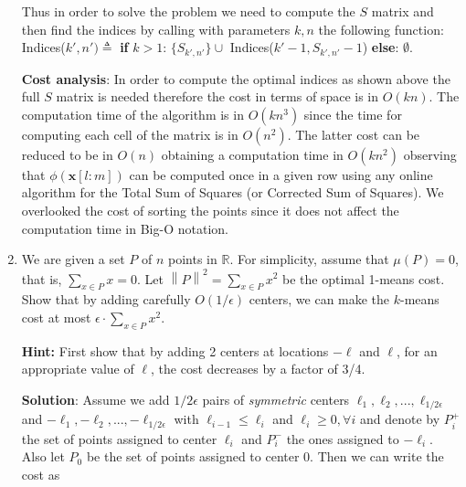 \documentclass[a4paper]{article}
\newcommand{\norm}[1]{\left\lVert#1\right\rVert}
\begin{document}
\begin{enumerate}
    Thus in order to solve the problem we need to compute the $S$ matrix and
    then find the indices by calling with parameters $k, n$ the following
    function: \\ Indices($k', n')\triangleq $\textbf{ if} $k > 1$:
    $\{S_{k',n'}\} \cup$
    Indices($k'-1, S_{k',n'} - 1$) \textbf{else}: $\emptyset $.

    \textbf{Cost analysis}: In order to compute the optimal indices as shown
    above the full $S$ matrix is needed therefore the cost in terms of space is
    in $O(kn)$. The computation time of the algorithm is in $O(kn^3)$ since
    the time for computing each cell of the matrix is in $O(n^2)$. The latter
    cost can be reduced to be in $O(n)$ obtaining a computation time in
    $O(kn^2)$ observing that $\phi(\mathbf{x}[l:m])$ can be computed once in a
    given row using any online algorithm for the Total Sum of Squares (or
    Corrected Sum of Squares). We overlooked the cost of sorting the points
    since it does not affect the computation time in Big-O notation.

  \item We are given a set $P$ of $n$ points in $\mathbb{R}$. For simplicity,
    assume that $\mu(P) = 0$, that is, $\sum_{x \in P} x = 0$. Let $\norm{P}^2 =
    \sum_{x \in P} x^2$ be the optimal 1-means cost. Show that by adding
    carefully $O(1/\epsilon)$ centers, we can make the $k$-means cost at most
    $\epsilon \cdot \sum_{x \in P} x^2$.

    \textbf{Hint:} First show that by adding 2 centers at locations $-\ell$ and
    $\ell$, for an appropriate value of $\ell$, the cost decreases by a factor of
    3/4.

    \textbf{Solution}:
    Assume we add $1/2\epsilon$ pairs of \textit{symmetric} centers $\ell_1,
    \ell_2, ..., \ell_{1/2\epsilon}$ and $-\ell_1,
    -\ell_2, ..., -\ell_{1/2\epsilon}$ with $\ell_{i - 1} \le \ell_i$ and
    $\ell_i \ge 0, \forall i$  and denote
    by $P_i^+$ the set of points
    assigned to center $\ell_i$ and $P_i^-$ the ones assigned to $- \ell_i$.
    Also let $P_0$ be the set of points assigned to center $0$.
    Then we can write the cost as


\end{enumerate}
\end{document}
